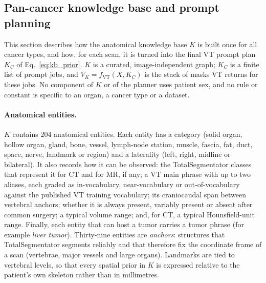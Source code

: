 \documentclass[fleqn,10pt]{olplainarticle}
\begin{document}
\subsection{Pan-cancer knowledge base and prompt planning}
\label{sec:kb_planning}

This section describes how the anatomical knowledge base $K$ is built once for all cancer types, and how, for each scan,
it is turned into the final VT prompt plan $K_C$ of Eq.~\eqref{eq:kb_prior}. $K$ is a curated, image-independent graph;
$K_C$ is a finite list of prompt jobs, and $V_K=f_{\mathrm{VT}}(X,K_C)$ is the stack of masks VT returns for these jobs.
No component of $K$ or of the planner uses patient sex, and no rule or constant is specific to an organ, a cancer type
or a dataset.

\paragraph{Anatomical entities.}
$K$ contains 204 anatomical entities. Each entity has a category (solid organ, hollow organ, gland, bone, vessel,
lymph-node station, muscle, fascia, fat, duct, space, nerve, landmark or region) and a laterality (left, right, midline
or bilateral). It also records how it can be observed: the TotalSegmentator classes that represent it for CT and for
MR, if any; a VT main phrase with up to two aliases, each graded as in-vocabulary, near-vocabulary or
out-of-vocabulary against the published VT training vocabulary; its craniocaudal span between vertebral anchors;
whether it is always present, variably present or absent after common surgery; a typical volume range; and, for CT, a
typical Hounsfield-unit range. Finally, each entity that can host a tumor carries a tumor phrase (for example
\emph{liver tumor}). Thirty-nine entities are \emph{anchors}: structures that TotalSegmentator segments reliably and
that therefore fix the coordinate frame of a scan (vertebrae, major vessels and large organs). Landmarks are tied to
vertebral levels, so that every spatial prior in $K$ is expressed relative to the patient's own skeleton rather than in
millimetres.
\end{document}
